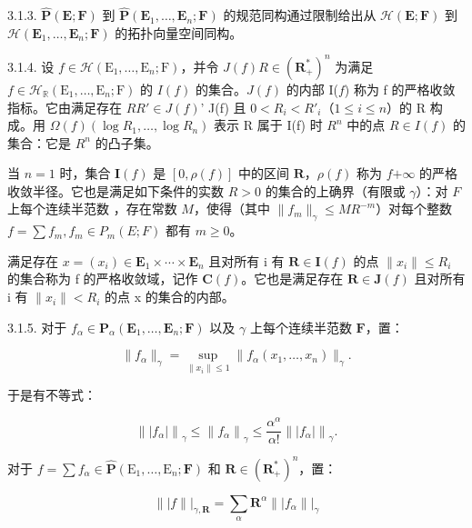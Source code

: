 3.1.3. \(\hat{\mathbf{P}}(\mathbf{E};\mathbf{F})\) 到 \(\hat{\mathbf{P}}(\mathbf{E}_{1},\ldots,\mathbf{E}_{n};\mathbf{F})\) 的规范同构通过限制给出从 \(\mathcal{H}(\mathbf{E};\mathbf{F})\) 到 \(\mathcal{H}(\mathbf{E}_{1},\ldots,\mathbf{E}_{n};\mathbf{F})\) 的拓扑向量空间同构。

3.1.4. 设 \(f \in \mathcal{H}(\mathrm{E}_1, \ldots, \mathrm{E}_n; \mathrm{F})\)，并令 \(J(f)\)\(R \in (\mathbf{R}_+^*)^n\) 为满足 \(f \in \mathcal{H}_{\mathbb{R}}(\mathrm{E}_1, \ldots, \mathrm{E}_n; \mathrm{F})\) 的 \(I(f)\) 的集合。\(J(f)\) 的内部 I(\(f\)) 称为 f 的严格收敛指标。它由满足存在 \(R\)\(R' \in J(f)\)'  J(f) 且 \(0 < R_i < R'_i\)（\(1 \leqslant i \leqslant n\)）的 R 构成。用 \(\Omega(f)\)\((\log R_1, \ldots, \log R_n)\) 表示 R 属于 I(f) 时 \(R^n\) 中的点 \(R \in I(f)\) 的集合：它是 \(R^n\) 的凸子集。

当 \(n=1\) 时，集合 \(\mathbf{I}(f)\) 是 \([0,\rho(f)]\) 中的区间 \(\mathbf{R}\)，\(\rho(f)\) 称为 \(f\)\(+\infty\) 的严格收敛半径。它也是满足如下条件的实数 \(R>0\) 的集合的上确界（有限或 \(\gamma\)）：对 \(F\) 上每个连续半范数 ，存在常数 \(M\)，使得（其中 \(\|f_{m}\|_{\gamma}\leqslant MR^{-m}\)）对每个整数 \(f=\sum f_{m},f_{m}\in P_{m}(E;F)\) 都有 \(m\geqslant0\)。

满足存在 \(x = (x_i) \in \mathbf{E}_1 \times \cdots \times \mathbf{E}_n\) 且对所有 i 有 \(\mathbf{R} \in \mathbf{I}(f)\) 的点 \(\|x_i\| \leqslant R_i\) 的集合称为 f 的严格收敛域，记作 \(\mathbf{C}(f)\)。它也是满足存在 \(\mathbf{R} \in \mathbf{J}(f)\) 且对所有 i 有 \(\|x_i\| < R_i\) 的点 x 的集合的内部。

3.1.5. 对于 \(f_{\alpha} \in \mathbf{P}_{\alpha}(\mathbf{E}_1, \ldots, \mathbf{E}_n; \mathbf{F})\) 以及 \(\gamma\) 上每个连续半范数 \(\mathbf{F}\)，置：

\[
\| f _ {\alpha} \| _ {\gamma} = \sup _ {\| x _ {i} \| \leqslant 1} \| f _ {\alpha} (x _ {1}, \dots , x _ {n}) \| _ {\gamma}.
\]

于是有不等式：

\[
\left\| \left| f _ {\alpha} \right| \right\| _ {\gamma} \leqslant \left\| f _ {\alpha} \right\| _ {\gamma} \leqslant \frac {\alpha^ {\alpha}}{\alpha !} \left\| \left| f _ {\alpha} \right| \right\| _ {\gamma}.
\]

对于 \(f = \sum f_{\alpha} \in \hat{\mathbf{P}}(\mathrm{E}_1, \ldots, \mathrm{E}_n; \mathbf{F})\) 和 \(\mathbf{R} \in (\mathbf{R}_{+}^{*})^n\)，置：

\[
\| | f \| | _ {\gamma , \mathbf {R}} = \sum_ {\alpha} \mathbf {R} ^ {\alpha} \| | f _ {\alpha} \| | _ {\gamma}
\]

